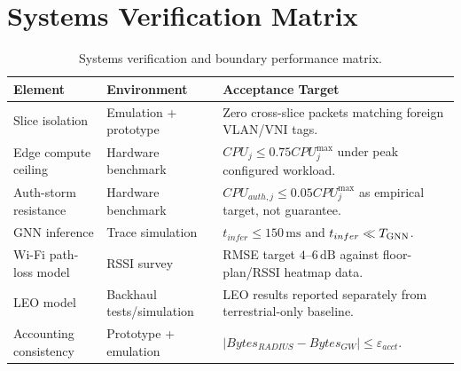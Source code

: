 \section{Systems Verification Matrix}
\label{sec:verification}

\begin{table}[H]
  \centering
  \caption{Systems verification and boundary performance matrix.}
  \label{tab:verification}
  \begin{tabularx}{\textwidth}{llX}
    \toprule
    \textbf{Element} & \textbf{Environment} & \textbf{Acceptance Target} \\
    \midrule
    Slice isolation & Emulation + prototype & Zero cross-slice packets matching foreign VLAN/VNI tags. \\
    Edge compute ceiling & Hardware benchmark & $CPU_j\leq0.75CPU_j^{\max}$ under peak configured workload. \\
    Auth-storm resistance & Hardware benchmark & $CPU_{auth,j}\leq0.05CPU_j^{\max}$ as empirical target, not guarantee. \\
    GNN inference & Trace simulation & $t_{infer}\leq150\,\mathrm{ms}$ and $t_{infer}\ll T_{\mathrm{GNN}}$. \\
    Wi-Fi path-loss model & RSSI survey & RMSE target $4$--$6\,\mathrm{dB}$ against floor-plan/RSSI heatmap data. \\
    LEO model & Backhaul tests/simulation & LEO results reported separately from terrestrial-only baseline. \\
    Accounting consistency & Prototype + emulation & $|Bytes_{RADIUS}-Bytes_{GW}|\leq\varepsilon_{acct}$. \\
    \bottomrule
  \end{tabularx}
\end{table}
